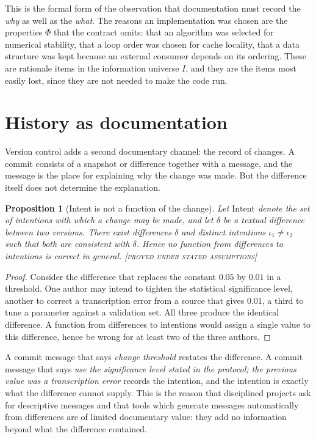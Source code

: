 \documentclass[11pt,twoside,openright]{book}
\theoremstyle{plain}
\newtheorem{proposition}[theorem]{Proposition}
\theoremstyle{definition}
\theoremstyle{remark}
\newcommand{\Proved}{\textup{\textsc{[proved under stated assumptions]}}}
\begin{document}
This is the formal form of the observation that documentation must record the \emph{why} as well as the \emph{what}. The reasons an implementation was chosen are the properties $\Phi$ that the contract omits: that an algorithm was selected for numerical stability, that a loop order was chosen for cache locality, that a data structure was kept because an external consumer depends on its ordering. These are rationale items in the information universe $I$, and they are the items most easily lost, since they are not needed to make the code run.

\section{History as documentation}

Version control adds a second documentary channel: the record of changes. A commit consists of a snapshot or difference together with a message, and the message is the place for explaining why the change was made. But the difference itself does not determine the explanation.

\begin{proposition}[Intent is not a function of the change]\label{prop:intent}
Let $\mathrm{Intent}$ denote the set of intentions with which a change may be made, and let $\delta$ be a textual difference between two versions. There exist differences $\delta$ and distinct intentions $\iota_1\neq\iota_2$ such that both are consistent with $\delta$. Hence no function from differences to intentions is correct in general.
\Proved{}
\end{proposition}

\begin{proof}
Consider the difference that replaces the constant $0.05$ by $0.01$ in a threshold. One author may intend to tighten the statistical significance level, another to correct a transcription error from a source that gives $0.01$, a third to tune a parameter against a validation set. All three produce the identical difference. A function from differences to intentions would assign a single value to this difference, hence be wrong for at least two of the three authors.
\end{proof}

A commit message that says \emph{change threshold} restates the difference. A commit message that says \emph{use the significance level stated in the protocol; the previous value was a transcription error} records the intention, and the intention is exactly what the difference cannot supply. This is the reason that disciplined projects ask for descriptive messages and that tools which generate messages automatically from differences are of limited documentary value: they add no information beyond what the difference contained.
\end{document}
